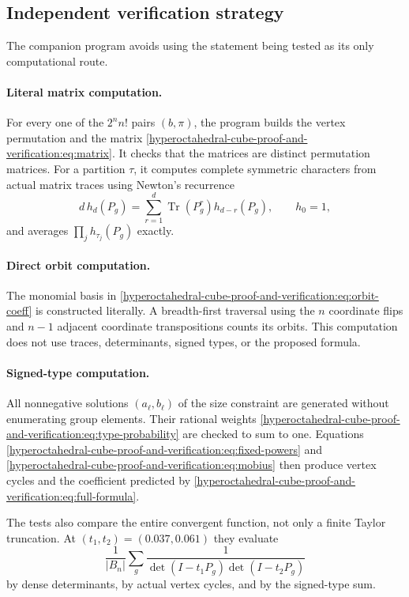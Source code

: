 \documentclass[10pt]{article}
\newcommand{\Tr}{\operatorname{Tr}}
\begin{document}
\subsection{Independent verification strategy}
The companion program avoids using the statement being tested as its only
computational route.

\paragraph{Literal matrix computation.}
For every one of the $2^n n!$ pairs $(b,\pi)$, the program builds the vertex
permutation and the matrix \eqref{hyperoctahedral-cube-proof-and-verification:eq:matrix}.  It checks that the matrices are
distinct permutation matrices.  For a partition $\tau$, it computes complete
symmetric characters from actual matrix traces using Newton's recurrence
\begin{equation}\label{hyperoctahedral-cube-proof-and-verification:eq:newton}
d\,h_d(P_g)=\sum_{r=1}^d\Tr(P_g^r)h_{d-r}(P_g),
\qquad h_0=1,
\end{equation}
and averages $\prod_jh_{\tau_j}(P_g)$ exactly.

\paragraph{Direct orbit computation.}
The monomial basis in \eqref{hyperoctahedral-cube-proof-and-verification:eq:orbit-coeff} is constructed literally.  A
breadth-first traversal using the $n$ coordinate flips and $n-1$ adjacent
coordinate transpositions counts its orbits.  This computation does not use
traces, determinants, signed types, or the proposed formula.

\paragraph{Signed-type computation.}
All nonnegative solutions $(a_\ell,b_\ell)$ of the size constraint are
generated without enumerating group elements.  Their rational weights
\eqref{hyperoctahedral-cube-proof-and-verification:eq:type-probability} are checked to sum to one.  Equations
\eqref{hyperoctahedral-cube-proof-and-verification:eq:fixed-powers} and \eqref{hyperoctahedral-cube-proof-and-verification:eq:mobius} then produce vertex cycles and
the coefficient predicted by \eqref{hyperoctahedral-cube-proof-and-verification:eq:full-formula}.

The tests also compare the entire convergent function, not only a finite
Taylor truncation.  At $(t_1,t_2)=(0.037,0.061)$ they evaluate
\[
\frac1{|B_n|}\sum_g
\frac1{\det(I-t_1P_g)\det(I-t_2P_g)}
\]
by dense determinants, by actual vertex cycles, and by the signed-type sum.
\end{document}
